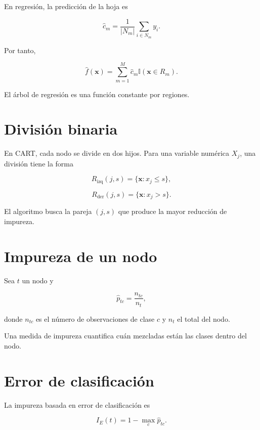 \documentclass[
  spanish,
  10.5pt,
  letterpaper,
  DIV=11,
  numbers=noendperiod,
  oneside,
  open=any]{scrreprt}
\theoremstyle{definition}
\theoremstyle{definition}
\theoremstyle{plain}
\theoremstyle{remark}
\begin{document}
En regresión, la predicción de la hoja es

\[
\widehat{c}_m
=
\frac{1}{|N_m|}
\sum_{i\in N_m}y_i.
\]

Por tanto,

\[
\widehat{f}(\mathbf{x})
=
\sum_{m=1}^{M}
\widehat{c}_m
\mathbb{I}(\mathbf{x}\in R_m).
\]

El árbol de regresión es una función constante por regiones.

\section*{División binaria}\label{divisiuxf3n-binaria}


En CART, cada nodo se divide en dos hijos. Para una variable numérica
\(X_j\), una división tiene la forma

\[
R_{\text{izq}}(j,s)
=
\{\mathbf{x}:x_j\leq s\},
\]

\[
R_{\text{der}}(j,s)
=
\{\mathbf{x}:x_j>s\}.
\]

El algoritmo busca la pareja \((j,s)\) que produce la mayor reducción de
impureza.

\section*{Impureza de un nodo}\label{impureza-de-un-nodo}


Sea \(t\) un nodo y

\[
\widehat{p}_{tc}
=
\frac{n_{tc}}{n_t},
\]

donde \(n_{tc}\) es el número de observaciones de clase \(c\) y \(n_t\)
el total del nodo.

Una medida de impureza cuantifica cuán mezcladas están las clases dentro
del nodo.

\section*{Error de clasificación}\label{error-de-clasificaciuxf3n}


La impureza basada en error de clasificación es

\[
I_E(t)
=
1-\max_c \widehat{p}_{tc}.
\]
\end{document}
